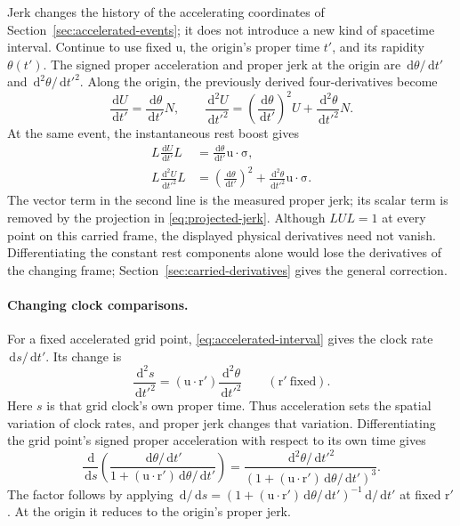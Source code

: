 \documentclass[11pt]{article}
\newcommand{\pv}[1]{{#1}}
\newcommand{\vstyle}[1]{{\bm{\mathrm{#1}}}}
\newcommand{\pL}{\pv{L}}
\newcommand{\pN}{\pv{N}}
\newcommand{\pU}{\pv{U}}
\numberwithin{equation}{section}
\newcommand{\dotprod}{\cdot}
\newcommand{\bsig}{\vstyle{\sigma}}
\newcommand{\br}{\vstyle{r}}
\newcommand{\bu}{\vstyle{u}}
\newcommand{\dd}{\,\mathrm d}
\begin{document}
Jerk changes the history of the accelerating coordinates of
Section~\ref{sec:accelerated-events}; it does not introduce a new kind
of spacetime interval. Continue to use fixed $\bu$, the origin's proper
time $t'$, and its rapidity $\theta(t')$. The signed proper acceleration
and proper jerk at the origin are $\dd\theta/\dd t'$ and
$\dd^2\theta/\dd t'^2$. Along the origin, the previously derived
four-derivatives become
\[
 \frac{\dd\pU}{\dd t'}=\frac{\dd\theta}{\dd t'}\pN,
 \qquad
 \frac{\dd^2\pU}{\dd t'^2}
 =\left(\frac{\dd\theta}{\dd t'}\right)^2\pU
 +\frac{\dd^2\theta}{\dd t'^2}\pN.
\]
At the same event, the instantaneous rest boost gives
\begin{equation}
 \boxed{\begin{aligned}
 \pL\frac{\dd\pU}{\dd t'}\pL
 &=\frac{\dd\theta}{\dd t'}\bu\dotprod\bsig,\\
 \pL\frac{\dd^2\pU}{\dd t'^2}\pL
 &=\left(\frac{\dd\theta}{\dd t'}\right)^2
 +\frac{\dd^2\theta}{\dd t'^2}\bu\dotprod\bsig.
 \end{aligned}}
 \label{eq:jerk-rest-frame-components}
\end{equation}
The vector term in the second line is the measured proper jerk; its
scalar term is removed by the projection in \eqref{eq:projected-jerk}.
Although $\pL\pU\pL=1$ at every point on this carried frame, the displayed
physical derivatives need not vanish. Differentiating the constant rest
components alone would lose the derivatives of the changing frame;
Section~\ref{sec:carried-derivatives} gives the general correction.

\paragraph{Changing clock comparisons.}
For a fixed accelerated grid point, \eqref{eq:accelerated-interval} gives
the clock rate $\dd s/\dd t'$. Its change is
\begin{equation}
 \boxed{\frac{\dd^2 s}{\dd t'^2}
 =(\bu\dotprod\br')\frac{\dd^2\theta}{\dd t'^2}
 \qquad(\br'\ \text{fixed}).}
 \label{eq:jerk-clock-gradient}
\end{equation}
Here $s$ is that grid clock's own proper time. Thus acceleration sets
the spatial variation of clock rates, and proper jerk changes that
variation. Differentiating the grid point's signed proper acceleration
with respect to its own time gives
\begin{equation}
 \frac{\dd}{\dd s}
 \left(\frac{\dd\theta/\dd t'}
 {1+(\bu\dotprod\br')\dd\theta/\dd t'}\right)
 =\frac{\dd^2\theta/\dd t'^2}
 {\left(1+(\bu\dotprod\br')\dd\theta/\dd t'\right)^3}.
 \label{eq:grid-proper-jerk}
\end{equation}
The factor follows by applying
$\dd/\dd s=(1+(\bu\dotprod\br')\dd\theta/\dd t')^{-1}\dd/\dd t'$
at fixed $\br'$. At the origin it reduces to the origin's proper jerk.
\end{document}
